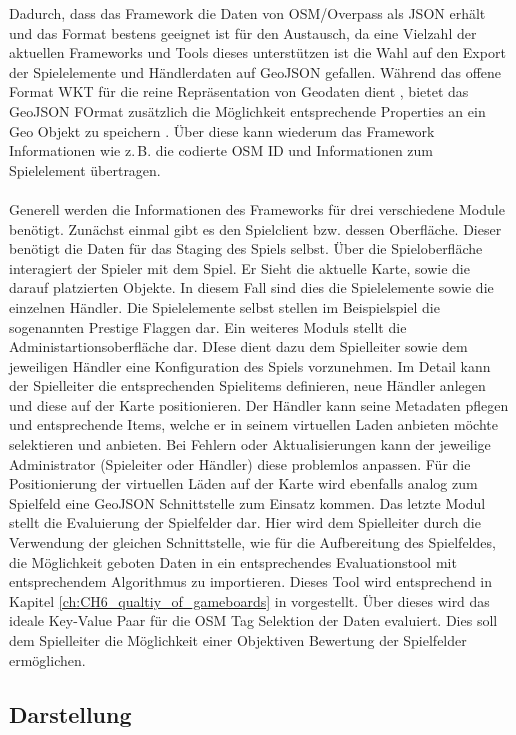 Dadurch, dass das Framework die Daten von OSM/Overpass als JSON erhält und das Format bestens geeignet ist für den Austausch, da eine Vielzahl der aktuellen Frameworks und Tools dieses unterstützen ist die Wahl auf den Export der Spielelemente und Händlerdaten auf GeoJSON gefallen. Während das offene Format WKT für die reine Repräsentation von Geodaten dient \cite{Stolze.2003}, bietet das GeoJSON FOrmat zusätzlich die Möglichkeit entsprechende Properties an ein Geo Objekt zu speichern \cite{Butler.2008}. Über diese kann wiederum das Framework Informationen wie z.\,B. die codierte OSM ID und Informationen zum Spielelement übertragen.
\\\\
Generell werden die Informationen des Frameworks für drei verschiedene Module benötigt.
Zunächst einmal gibt es den Spielclient bzw. dessen Oberfläche. Dieser benötigt die Daten für das Staging des Spiels selbst.
Über die Spieloberfläche interagiert der Spieler mit dem Spiel. Er Sieht die aktuelle Karte, sowie die darauf platzierten Objekte. In diesem Fall sind dies die Spielelemente sowie die einzelnen Händler. Die Spielelemente selbst stellen im Beispielspiel die sogenannten Prestige Flaggen dar.
Ein weiteres Moduls stellt die Administartionsoberfläche dar. DIese dient dazu dem Spielleiter sowie dem jeweiligen Händler eine Konfiguration des Spiels vorzunehmen. Im Detail kann der Spielleiter die entsprechenden Spielitems definieren, neue Händler anlegen und diese auf der Karte positionieren. Der Händler kann seine Metadaten pflegen und entsprechende Items, welche er in seinem virtuellen Laden anbieten möchte selektieren und anbieten. Bei Fehlern oder Aktualisierungen kann der jeweilige Administrator (Spieleiter oder Händler) diese problemlos anpassen. Für die Positionierung der virtuellen Läden auf der Karte wird ebenfalls analog zum Spielfeld eine GeoJSON Schnittstelle zum Einsatz kommen.
Das letzte Modul stellt die Evaluierung der Spielfelder dar. Hier wird dem Spielleiter durch die Verwendung der gleichen Schnittstelle, wie für die Aufbereitung des Spielfeldes, die Möglichkeit geboten Daten in ein entsprechendes Evaluationstool mit entsprechendem Algorithmus  zu importieren. Dieses Tool wird entsprechend in Kapitel \ref{ch:CH6_qualtiy_of_gameboards} in vorgestellt. Über dieses wird das ideale Key-Value Paar für die OSM Tag Selektion der Daten evaluiert. Dies soll dem Spielleiter die Möglichkeit einer Objektiven Bewertung der Spielfelder ermöglichen.

\subsection*{Darstellung}

